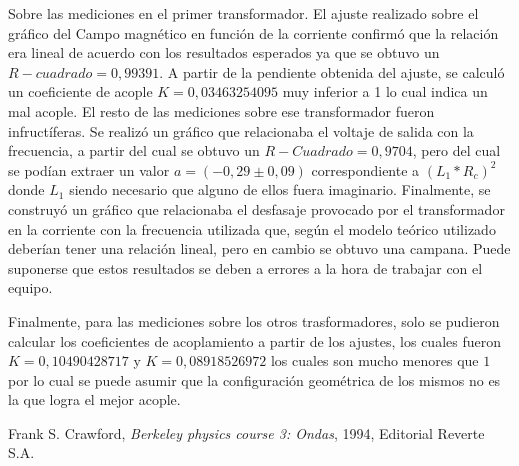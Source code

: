 \documentclass[11pt,a4paper]{article}
\begin{document}
Sobre las mediciones en el primer transformador. El ajuste realizado sobre el gráfico del Campo magnético en función de la corriente confirmó que la relación era lineal de acuerdo con los resultados esperados ya que se obtuvo un $R-cuadrado =0,99391$. A partir de la pendiente obtenida del ajuste, se calculó un coeficiente de acople $K = 0,03463254095$ muy inferior a 1 lo cual indica un mal acople. El resto de las mediciones sobre ese transformador fueron infructíferas. Se realizó un gráfico que relacionaba el voltaje de salida con la frecuencia, a partir del cual se obtuvo un $R-Cuadrado= 0,9704$, pero del cual se podían extraer un valor $a = (-0,29 \pm 0,09)$ correspondiente a $(L_{1}*R_{c})^2$ donde $L_{1}$  siendo necesario que alguno de ellos fuera imaginario. Finalmente, se construyó un gráfico que relacionaba el desfasaje provocado por el transformador en la corriente con la frecuencia utilizada que, según el modelo teórico utilizado deberían tener una relación lineal, pero en cambio se obtuvo una campana. Puede suponerse que estos resultados se deben a errores a la hora de trabajar con el equipo.

Finalmente, para las mediciones sobre los otros trasformadores, solo se pudieron calcular los coeficientes de acoplamiento a partir de los ajustes, los cuales fueron $K = 0,10490428717$ y $K = 0,08918526972$ los cuales son mucho menores que $1$ por lo cual se puede asumir que la configuración geométrica de los mismos no es la que logra el mejor acople.









\begin{thebibliography}{1}
  Frank S. Crawford, \textit{Berkeley physics course 3: Ondas}, 1994, Editorial Reverte S.A.
\end{thebibliography}
 
\end{document}
